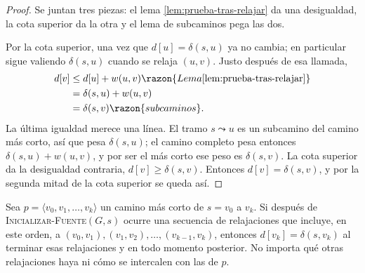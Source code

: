 \documentclass[11pt,letterpaper]{article}
\begin{document}
\begin{proof}
  Se juntan tres piezas: el lema \ref{lem:prueba-tras-relajar} da una
  desigualdad, la cota superior da la otra y el lema de subcaminos
  pega las dos.

  Por la cota superior, una vez que $d[u] = \delta(s, u)$ ya no
  cambia; en particular sigue valiendo $\delta(s, u)$ cuando se relaja
  $(u, v)$. Justo después de esa llamada,
  \begin{align*}
    d[v] &\le d[u] + w(u, v)
           \razon{Lema \ref{lem:prueba-tras-relajar}} \\
         &= \delta(s, u) + w(u, v) \\
         &= \delta(s, v) \razon{subcaminos} .
  \end{align*}
  La última igualdad merece una línea. El tramo $s \leadsto u$ es un
  subcamino del camino más corto, así que pesa $\delta(s, u)$; el
  camino completo pesa entonces $\delta(s, u) + w(u, v)$, y por ser
  el más corto ese peso es $\delta(s, v)$. La cota superior da la
  desigualdad contraria, $d[v] \ge \delta(s, v)$. Entonces
  $d[v] = \delta(s, v)$, y por la segunda mitad de la cota superior se
  queda así.
\end{proof}

\begin{lema}
  \label{lem:prueba-relajacion-caminos}
  Sea $p = \langle v_0, v_1, \dots, v_k \rangle$ un camino más corto
  de $s = v_0$ a $v_k$. Si después de
  \textsc{Inicializar-Fuente}$(G, s)$ ocurre una secuencia de
  relajaciones que incluye, en este orden, a
  $(v_0, v_1), (v_1, v_2), \dots, (v_{k-1}, v_k)$, entonces
  $d[v_k] = \delta(s, v_k)$ al terminar esas relajaciones y en todo
  momento posterior. No importa qué otras relajaciones haya ni cómo
  se intercalen con las de $p$.
\end{lema}
\end{document}
